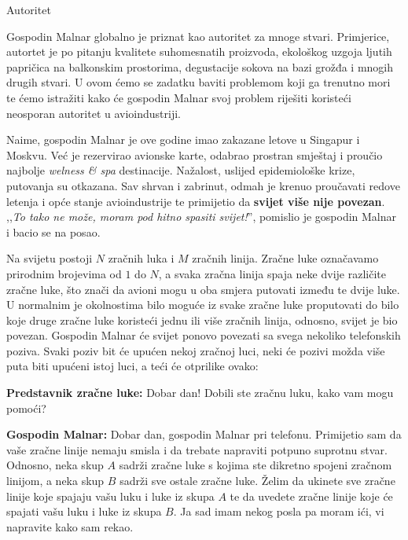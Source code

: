 \begin{statement}[
  problempoints=100,
  timelimit=1 sekunda,
  memorylimit=512 MiB,
]{Autoritet}

Gospodin Malnar globalno je priznat kao autoritet za mnoge stvari. Primjerice,
autortet je po pitanju kvalitete suhomesnatih proizvoda, ekološkog uzgoja
ljutih papričica na balkonskim prostorima, degustacije sokova na bazi grožđa
i mnogih drugih stvari.  U ovom ćemo se zadatku baviti problemom koji ga
trenutno mori te ćemo istražiti kako će gospodin Malnar svoj problem riješiti
koristeći neosporan autoritet u avioindustriji.

Naime, gospodin Malnar je ove godine imao zakazane letove u Singapur i Moskvu.
Već je rezervirao avionske karte, odabrao prostran smještaj i proučio
najbolje \textit{welness \& spa} destinacije. Nažalost, uslijed epidemiološke
krize, putovanja su otkazana. Sav shrvan i zabrinut, odmah je krenuo
proučavati redove letenja i opće stanje avioindustrije te primijetio da
\textbf{svijet više nije povezan}. ,,\textit{To tako ne može, moram pod hitno
spasiti svijet!}'', pomislio je gospodin Malnar i bacio se na posao.

Na svijetu postoji $N$ zračnih luka i $M$ zračnih linija. Zračne luke
označavamo prirodnim brojevima od $1$ do $N$, a svaka zračna linija spaja
neke dvije različite zračne luke, što znači da avioni mogu u oba smjera
putovati između te dvije luke. U normalnim je okolnostima bilo moguće iz
svake zračne luke proputovati do bilo koje druge zračne luke koristeći jednu
ili više zračnih linija, odnosno, svijet je bio povezan. Gospodin Malnar će
svijet ponovo povezati sa svega nekoliko telefonskih poziva. Svaki poziv bit
će upućen nekoj zračnoj luci, neki će pozivi možda više puta biti upućeni
istoj luci, a teći će otprilike ovako:

\textbf{Predstavnik zračne luke:} Dobar dan! Dobili ste zračnu luku, kako vam
mogu pomoći?

\textbf{Gospodin Malnar:} Dobar dan, gospodin Malnar pri telefonu. Primijetio
sam da vaše zračne linije nemaju smisla i da trebate napraviti potpuno
suprotnu stvar. Odnosno, neka skup $A$ sadrži zračne luke s kojima ste
dikretno spojeni zračnom linijom, a neka skup $B$ sadrži sve ostale zračne
luke. Želim da ukinete sve zračne linije koje spajaju vašu luku i luke iz
skupa $A$ te da uvedete zračne linije koje će spajati vašu luku i luke iz
skupa $B$. Ja sad imam nekog posla pa moram ići, vi napravite kako sam rekao.


\end{statement}

